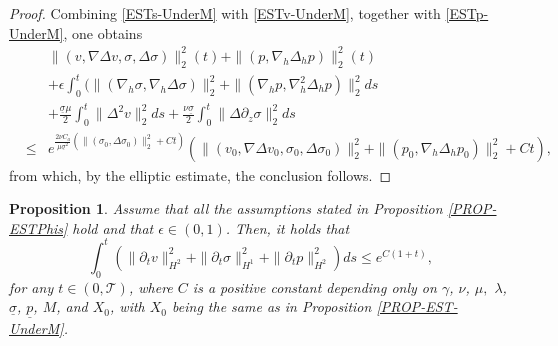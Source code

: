 \documentclass[12pt,reqno]{amsart}
\numberwithin{equation}{section}
\newtheorem{proposition}[theorem]{Proposition}
\begin{document}
\begin{proof}
Combining \eqref{ESTs-UnderM} with \eqref{ESTv-UnderM}, together with \eqref{ESTp-UnderM}, one obtains
\begin{eqnarray*}
  &&\|(v,\nabla\Delta v, \sigma, \Delta\sigma)\|_2^2(t)+\|(p,\nabla_h\Delta_hp)\|_2^2(t)\nonumber\\
  &&+\epsilon\int_0^t(\|(\nabla_h\sigma,\nabla_h\Delta\sigma)\|_2^2+\|(\nabla_hp,\nabla_h^2\Delta_hp)\|_2^2ds\nonumber\\
  &&+\frac{\underline\sigma\mu}{2}\int_0^t\|\Delta^2v\|_2^2ds +\frac{\nu\underline\sigma}{2}\int_0^t\|\Delta\partial_z\sigma\|_2^2ds\nonumber \\
  &\leq& e^{\frac{2\nu {C_a}}{\mu\underline\sigma^2}(\|(\sigma_0,\Delta\sigma_0)\|_2^2+Ct) }(\|(v_0,\nabla\Delta v_0,\sigma_0,\Delta\sigma_0)\|_2^2+\|(p_0,\nabla_h\Delta_hp_0)\|_2^2+Ct),
\end{eqnarray*}
from which, by the elliptic estimate, the conclusion follows.
\end{proof}

\begin{proposition}
  \label{PROP-EST-UnderM-Time}
  Assume that all the assumptions stated in Proposition \ref{PROP-ESTPhis} hold and that $\epsilon\in(0,1)$. Then, it holds that
  \begin{equation*}
    \int_0^t(\|\partial_tv\|_{H^2}^2+\|\partial_t\sigma\|_{H^1}^2+\|\partial_tp\|_{H^2}^2)ds\leq e^{C(1+t)},
  \end{equation*}
  for any $t\in(0,\mathcal T)$, where $C$ is a positive constant depending only on $\gamma$, $\nu$, $\mu,$
$\lambda$, $\underline\sigma$, $\underline p$, $M$, and $X_0$, with $X_0$ being the same as in Proposition \ref{PROP-EST-UnderM}.
\end{proposition}
\end{document}

